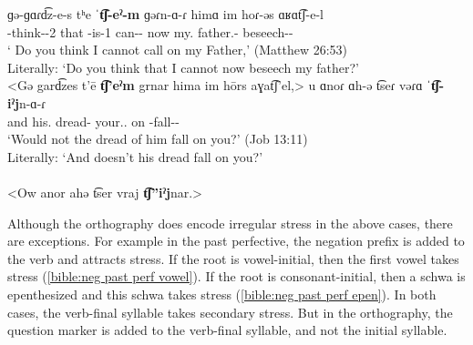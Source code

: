 \begin{exe}
	\ex 
	\begin{xlist}
		\ex \gll ɡə-ɡɑɾd͡z-e-s tʰe ˈ\textbf{t͡ʃ-eˀ-m} ɡəɾn-ɑ-ɾ himɑ im hoɾ-əs ɑʁɑt͡ʃ-e-l \\
		{\ind}-think-{\thgloss}-2{\sg} that {\neggloss}-is-1{\sg} can-{\thgloss}-{\cn} now my.{\gen} father.{\obl}-{\possFsg} beseech-{\thgloss}-{\infgloss} \\
		\trans ` Do you think I cannot call on my Father,' \hfill (Matthew 26:53) \label{bible:neg indc clitic}
		\\ 
		Literally: `Do you think that I cannot now beseech my father?' 
		\\ <Gə gard͡zes t'ē \textbf{t͡ʃ'eˀm} grnar hima im hōrs aɣat͡ʃ'el,> 
		\ex \gll u ɑnoɾ ɑh-ə t͡seɾ vəɾɑ ˈ\textbf{t͡ʃ-iˀj}n-ɑ-ɾ \\
		and his.{\gen} dread-{} your.{\gen}.{\pl} on {\neggloss}-fall-{\thgloss}-{\cn} \\
		\trans `Would not the dread of him fall on you?' \hfill (Job 13:11)  \label{ex:bible neg 3sg indic}
		\\
		Literally: `And doesn't his dread fall on you?' 
		\\ 
		\\ <Ow anor ahə t͡ser vraj \textbf{t͡ʃ''iˀj}nar.> 
		
	\end{xlist}
\end{exe}

Although the orthography does encode irregular stress in the above cases, there are exceptions. For example in the past perfective, the negation prefix is added to the verb and attracts stress. If the root is vowel-initial, then the first vowel takes stress (\ref{bible:neg past perf vowel}). If the root is consonant-initial, then a schwa is epenthesized and this schwa takes stress (\ref{bible:neg past perf epen}). In both cases, the verb-final syllable takes secondary stress. But in the orthography, the question marker is added to the verb-final syllable, and not the initial  syllable. 

